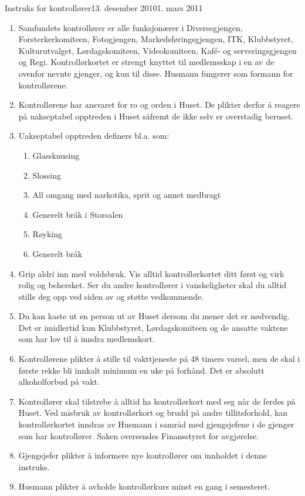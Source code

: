 \begin{instruks}{Instruks for kontrollører}{13. desember 2010}{1. mars 2011}

    \begin{enumerate}
        \item Samfundets kontrollører er alle funksjonærer i Diversegjengen,
            Forsterkerkomiteen, Fotogjengen, Markedsføringsgjengen, ITK, 
Klubbstyret, Kulturutvalget, Lørdagskomiteen,
            Videokomiteen,
            Kaf\'e- og serveringsgjengen og Regi. Kontrollørkortet er 
strengt knyttet til medlemsskap
            i en av de ovenfor nevnte gjenger,
            og kun til disse. Husmann fungerer som formann for kontrollørene.
        \item Kontrollørene har ansvaret for ro og orden i Huset. De plikter derfor å
            reagere på uakseptabel opptreden i
            Huset såfremt de ikke selv er overstadig beruset.
        \item Uakseptabel opptreden definers bl.a. som:
            \begin{enumerate}
                \item  Glassknusing
                \item  Slossing
                \item  All omgang med narkotika, sprit og annet medbragt
                \item  Generelt bråk i Storsalen
                \item  Røyking
                \item  Generelt bråk
            \end{enumerate}
        \item Grip aldri inn med voldsbruk. Vis alltid kontrollørkortet ditt først og virk
            rolig og behersket. Ser du andre
            kontrollører i vanskeligheter skal du alltid stille deg opp ved siden av og
            støtte vedkommende.
        \item Du kan kaste ut en person ut av Huset dersom du mener det er nødvendig. Det
            er imidlertid kun Klubbstyret,
            Lørdagskomiteen og de ansatte vaktene som har lov til å inndra medlemskort.
        \item Kontrollørene plikter å stille til vakttjeneste på 48 timers varsel, men de
            skal i første rekke bli innkalt
            minimum en uke på forhånd. Det er absolutt alkoholforbud på vakt.
        \item  Kontrollører skal tilstrebe å alltid ha kontrollørkort med seg når de
            ferdes på Huset. Ved misbruk av
            kontrollørkort og brudd på andre tillitsforhold, kan kontrollørkortet inndras
            av Husmann i samråd med
            gjengsjefene i de gjenger som har kontrollører. Saken oversendes Finansstyret
            for avgjørelse.
        \item Gjengsjefer plikter å informere nye kontrollører om innholdet i denne
            instruks.
        \item Husmann plikter å avholde kontrollørkurs minst en gang i semesteret.
    \end{enumerate}

\end{instruks}


